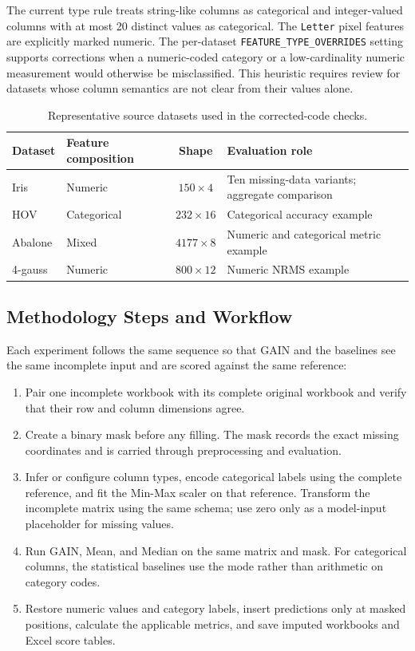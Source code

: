 \documentclass[11pt]{article}
\begin{document}
The current type rule treats string-like columns as categorical and integer-valued columns with at most 20 distinct values as categorical. The \texttt{Letter} pixel features are explicitly marked numeric. The per-dataset \texttt{FEATURE\_TYPE\_OVERRIDES} setting supports corrections when a numeric-coded category or a low-cardinality numeric measurement would otherwise be misclassified. This heuristic requires review for datasets whose column semantics are not clear from their values alone.

\begin{table}[ht]
\centering
\small
\caption{Representative source datasets used in the corrected-code checks.}
\begin{tabularx}{\linewidth}{l l c X}
\toprule
Dataset & Feature composition & Shape & Evaluation role \\
\midrule
Iris & Numeric & $150\times4$ & Ten missing-data variants; aggregate comparison \\
HOV & Categorical & $232\times16$ & Categorical accuracy example \\
Abalone & Mixed & $4177\times8$ & Numeric and categorical metric example \\
4-gauss & Numeric & $800\times12$ & Numeric NRMS example \\
\bottomrule
\end{tabularx}
\end{table}

\subsection{Methodology Steps and Workflow}
Each experiment follows the same sequence so that GAIN and the baselines see the same incomplete input and are scored against the same reference:
\begin{enumerate}
  \item Pair one incomplete workbook with its complete original workbook and verify that their row and column dimensions agree.
  \item Create a binary mask before any filling. The mask records the exact missing coordinates and is carried through preprocessing and evaluation.
  \item Infer or configure column types, encode categorical labels using the complete reference, and fit the Min-Max scaler on that reference. Transform the incomplete matrix using the same schema; use zero only as a model-input placeholder for missing values.
  \item Run GAIN, Mean, and Median on the same matrix and mask. For categorical columns, the statistical baselines use the mode rather than arithmetic on category codes.
  \item Restore numeric values and category labels, insert predictions only at masked positions, calculate the applicable metrics, and save imputed workbooks and Excel score tables.
\end{enumerate}
\end{document}
